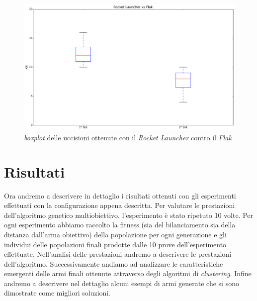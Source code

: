 \documentclass[12pt, italian]{toptesi}
\begin{document}
\begin{figure}[htp]
\centering
\includegraphics[width=1.0\textwidth]{kill_rocket_vs_flak}
\caption{\emph{boxplot} delle uccisioni ottenute con il \emph{Rocket Launcher} contro il \emph{Flak}}
\label{fig:kill_rocket_vs_flak}
\end{figure}

\section{Risultati}
\label{sec:single_weap_result}
Ora andremo a descrivere in dettaglio i risultati ottenuti con gli esperimenti effettuati con la configurazione appena descritta.
Per valutare le prestazioni dell'algoritmo genetico multiobiettivo, l'esperimento è stato ripetuto 10 volte. Per ogni esperimento abbiamo raccolto la fitness (sia del bilanciamento sia della distanza dall'arma obiettivo) della popolazione per ogni generazione e gli individui delle popolazioni finali prodotte dalle 10 prove dell'esperimento effettuate.
Nell'analisi delle prestazioni andremo a descrivere le prestazioni dell'algoritmo.
Successivamente andiamo ad analizzare le caratteristiche emergenti delle armi finali ottenute attraverso degli algoritmi di \emph{clustering}.
Infine andremo a descrivere nel dettaglio alcuni esempi di armi generate che si sono dimostrate come migliori soluzioni.
\end{document}

